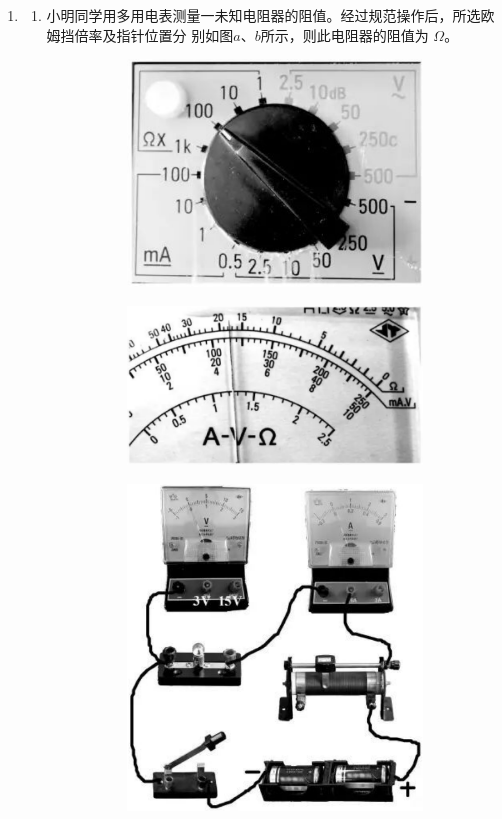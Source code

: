\begin{enumerate}
\item 
\begin{enumerate}
\item
小明同学用多用电表测量一未知电阻器的阻值。经过规范操作后，所选欧姆挡倍率及指针位置分
别如图$ a $、$ b $所示，则此电阻器的阻值为 \underlinegap $ \Omega $。
\begin{figure}[h!]
\centering
\begin{subfigure}{0.4\linewidth}
\centering
\includegraphics[width=0.7\linewidth]{picture/screenshot090}
\caption{}\label{}
\end{subfigure}
\begin{subfigure}{0.4\linewidth}
\centering
\includegraphics[width=0.8\linewidth]{picture/screenshot091}
\caption{}\label{}
\end{subfigure}
\begin{subfigure}{0.4\linewidth}
\centering
\includegraphics[width=0.7\linewidth]{picture/screenshot089}

\end{subfigure}
\end{figure}
\end{enumerate}
\end{enumerate}
